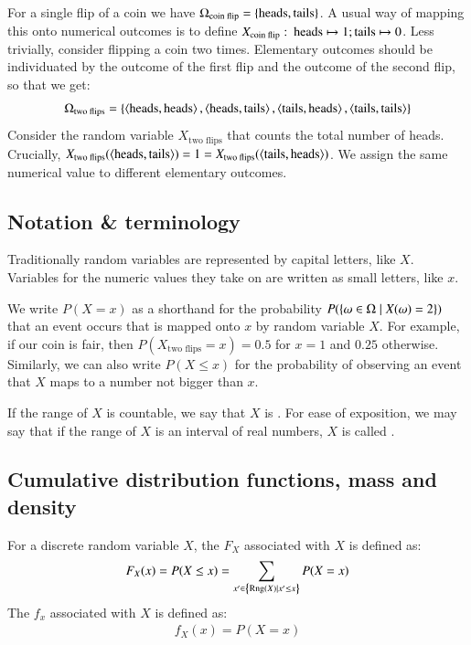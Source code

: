 \documentclass[nobib,nofonts]{tufte-handout}
\begin{document}
\begin{example}
  For a single flip of a coin we have $\Omega_{\text{coin flip}} =
  \left\{\text{heads}, \text{tails}\right\}$. A usual way of mapping this onto numerical outcomes is to
  define $X_{\text{coin flip}} \thinspace \colon \thinspace \text{heads} \mapsto 1; \text{tails} \mapsto 0$. Less trivially, consider
  flipping a coin two times. Elementary outcomes should be individuated by the outcome of the
  first flip and the outcome of the second flip, so that we get:
  \begin{align*}
    \Omega_{\text{two flips}} = \left\{\left \langle \text{heads}, \text{heads}\right\rangle, \left \langle \text{heads}, \text{tails}\right\rangle,
    \left \langle \text{tails}, \text{heads}\right\rangle, \left \langle \text{tails}, \text{tails}\right\rangle\right\}
  \end{align*}
  Consider the random variable $X_{\text{two flips}}$ that counts the
  total number of heads. Crucially,
  $X_{\text{two flips}}(\left \langle \text{heads}, \text{tails}\right\rangle) = 1 = X_{\text{two
      flips}}(\left \langle \text{tails}, \text{heads}\right\rangle)$. We assign the same numerical value to
  different elementary outcomes.
\end{example}


\subsection{Notation \& terminology}

Traditionally random variables are represented by capital letters, like $X$. Variables for the
numeric values they take on are written as small letters, like $x$.

We write $P(X = x)$ as a shorthand for the probability
$P(\left\{\omega \in \Omega \mid X(\omega) = 2\right\})$ that an event occurs that is mapped onto $x$ by
random variable $X$. For example, if our coin is fair, then $P(X_{\text{two flips}} = x) = 0.5$
for $x=1$ and $0.25$ otherwise. Similarly, we can also write $P(X \le x)$ for the probability
of observing an event that $X$ maps to a number not bigger than $x$.

If the range of $X$ is countable, we say that $X$ is . For ease of
exposition, we may say that if the range of $X$ is an interval of real numbers, $X$ is
called .

\subsection{Cumulative distribution functions, mass and density}

For a discrete random variable $X$, the  $F_X$
associated with $X$ is defined as:
\begin{align*}
  F_X(x) = P(X \le x) = \sum_{x' \in \left\{\text{Rng}(X) \mid x' \le x\right\}} P(X = x)
\end{align*}
The  $f_x$ associated with $X$ is defined as:
\begin{align*}
  f_X(x) = P(X = x)
\end{align*}
\end{document}
